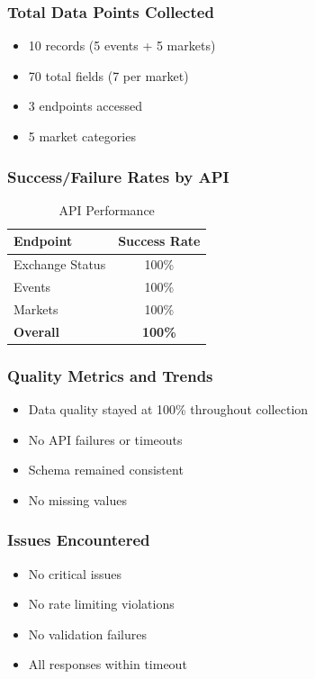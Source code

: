 \documentclass[12pt,a4paper]{article}
\begin{document}
\subsubsection{Total Data Points Collected}

\begin{itemize}
  \item 10 records (5 events + 5 markets)
  \item 70 total fields (7 per market)
  \item 3 endpoints accessed
  \item 5 market categories
\end{itemize}

\subsubsection{Success/Failure Rates by API}

\begin{table}[h]
\centering
\begin{tabular}{|l|c|}
\hline
\textbf{Endpoint} & \textbf{Success Rate} \\
\hline
Exchange Status & 100\% \\
Events & 100\% \\
Markets & 100\% \\
\hline
\textbf{Overall} & \textbf{100\%} \\
\hline
\end{tabular}
\caption{API Performance}
\label{tab:api_performance}
\end{table}

\subsubsection{Quality Metrics and Trends}

\begin{itemize}
  \item Data quality stayed at 100\% throughout collection
  \item No API failures or timeouts
  \item Schema remained consistent
  \item No missing values
\end{itemize}

\subsubsection{Issues Encountered}

\begin{itemize}
  \item No critical issues
  \item No rate limiting violations
  \item No validation failures
  \item All responses within timeout
\end{itemize}
\end{document}
